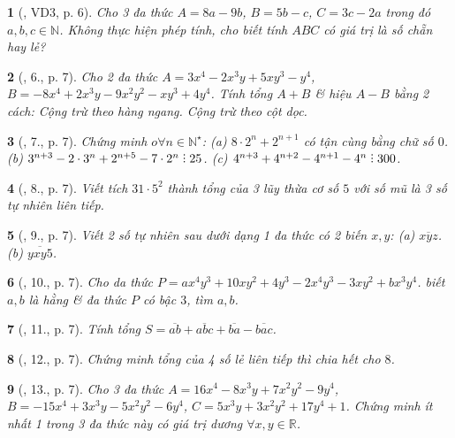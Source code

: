 \documentclass{article}
\newtheorem{baitoan}{}
\DeclareRobustCommand{\divby}{%
	\mathrel{\vbox{\baselineskip.65ex\lineskiplimit0pt\hbox{.}\hbox{.}\hbox{.}}}%
}
\begin{document}
\begin{baitoan}[\cite{Tuyen_Toan_8}, VD3, p. 6]
	Cho 3 đa thức $A = 8a - 9b$, $B = 5b - c$, $C = 3c - 2a$ trong đó $a,b,c\in\mathbb{N}$. Không thực hiện phép tính, cho biết tính $ABC$ có giá trị là số chẵn hay lẻ?
\end{baitoan}

\begin{baitoan}[\cite{Tuyen_Toan_8}, 6., p. 7]
	Cho 2 đa thức $A = 3x^4 - 2x^3y + 5xy^3 - y^4$, $B = -8x^4 + 2x^3y - 9x^2y^2 - xy^3 + 4y^4$. Tính tổng $A + B$ \& hiệu $A - B$ bằng 2 cách: Cộng trừ theo hàng ngang. Cộng trừ theo cột dọc.
\end{baitoan}

\begin{baitoan}[\cite{Tuyen_Toan_8}, 7., p. 7]
	Chứng minh $o\forall n\in\mathbb{N}^\star$: (a) $8\cdot2^n + 2^{n+1}$ có tận cùng bằng chữ số $0$. (b) $3^{n+3} - 2\cdot3^n + 2^{n+5} - 7\cdot2^n\divby25$. (c) $4^{n+3} + 4^{n+2} - 4^{n+1} - 4^n\divby300$. 
\end{baitoan}

\begin{baitoan}[\cite{Tuyen_Toan_8}, 8., p. 7]
	Viết tích $31\cdot5^2$ thành tổng của 3 lũy thừa cơ số $5$ với số mũ là 3 số tự nhiên liên tiếp.
\end{baitoan}

\begin{baitoan}[\cite{Tuyen_Toan_8}, 9., p. 7]
	Viết 2 số tự nhiên sau dưới dạng 1 đa thức có 2 biến $x,y$: (a) $\overline{xyz}$. (b) $\overline{yxy5}$.
\end{baitoan}

\begin{baitoan}[\cite{Tuyen_Toan_8}, 10., p. 7]
	Cho da thức $P = ax^4y^3 + 10xy^2 + 4y^3 - 2x^4y^3 - 3xy^2 + bx^3y^4$. biết $a,b$ là hằng \& đa thức $P$ có bậc $3$, tìm $a,b$.
\end{baitoan}

\begin{baitoan}[\cite{Tuyen_Toan_8}, 11., p. 7]
	Tính tổng $S = \overline{ab} + \overline{abc} + \overline{ba} -\overline{bac}$.
\end{baitoan}

\begin{baitoan}[\cite{Tuyen_Toan_8}, 12., p. 7]
	Chứng minh tổng của 4 số lẻ liên tiếp thì chia hết cho $8$.
\end{baitoan}

\begin{baitoan}[\cite{Tuyen_Toan_8}, 13., p. 7]
	Cho 3 đa thức $A = 16x^4 - 8x^3y + 7x^2y^2 - 9y^4$, $B = -15x^4 + 3x^3y - 5x^2y^2 - 6y^4$, $C = 5x^3y + 3x^2y^2 + 17y^4 + 1$. Chứng minh ít nhất 1 trong 3 đa thức này có giá trị dương $\forall x,y\in\mathbb{R}$.
\end{baitoan}
\end{document}
